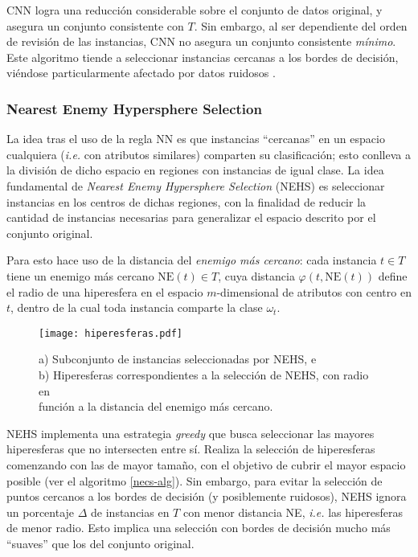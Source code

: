 CNN logra una reducción considerable sobre el conjunto de datos original, y asegura un conjunto consistente con $T$. Sin embargo, al ser dependiente del orden de revisión de las instancias, CNN no asegura un conjunto consistente \emph{mínimo}. Este algoritmo tiende a seleccionar instancias cercanas a los bordes de decisión, viéndose particularmente afectado por datos ruidosos \cite{amal2011survey, Jankowski_comparisonof}.

\subsubsection{Nearest Enemy Hypersphere Selection}

La idea tras el uso de la regla NN es que instancias ``cercanas'' en un espacio cualquiera (\emph{i.e.} con atributos similares) comparten su clasificación; esto conlleva a la división de dicho espacio en regiones con instancias de igual clase. La idea fundamental de \emph{Nearest Enemy Hypersphere Selection} (NEHS) es seleccionar instancias en los centros de dichas regiones, con la finalidad de reducir la cantidad de instancias necesarias para generalizar el espacio descrito por el conjunto original.

Para esto hace uso de la distancia del \emph{enemigo más cercano}: cada instancia $t \in T$ tiene un enemigo más cercano $\mathrm{NE}(t) \in T$, cuya distancia $\varphi(t,\mathrm{NE}(t))$ define el radio de una hiperesfera en el espacio $m$-dimensional de atributos con centro en $t$, dentro de la cual toda instancia comparte la clase $\omega_t$.

\begin{figure}[h!]
\centering
\texttt{[image: hiperesferas.pdf]}
\caption[Selección obtenida por NEHS]{a) Subconjunto de instancias seleccionadas por NEHS, e\\b) Hiperesferas correspondientes a la selección de NEHS, con radio en\\función a la distancia del enemigo más cercano.}
\label{seleccion}
\end{figure}

NEHS implementa una estrategia \emph{greedy} que busca seleccionar las mayores hiperesferas que no intersecten entre sí. Realiza la selección de hiperesferas comenzando con las de mayor tamaño, con el objetivo de cubrir el mayor espacio posible (ver el algoritmo \ref{necs-alg}). Sin embargo, para evitar la selección de puntos cercanos a los bordes de decisión (y posiblemente ruidosos), NEHS ignora un porcentaje $\Delta$ de instancias en $T$ con menor distancia NE, \emph{i.e.} las hiperesferas de menor radio. Esto implica una selección con bordes de decisión mucho más ``suaves'' que los del conjunto original.

